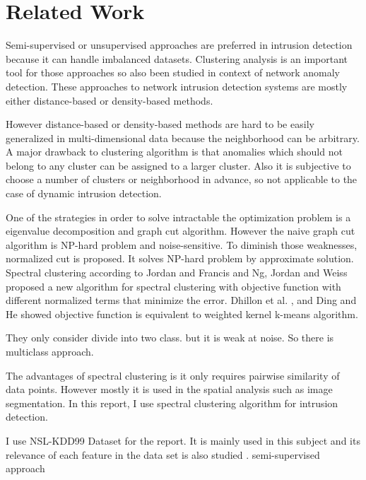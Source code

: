 \section{Related Work}
Semi-supervised or unsupervised approaches are preferred in intrusion detection\cite{chandola09} because it can handle imbalanced datasets.
Clustering analysis is an important tool for those approaches so also been studied in context of network anomaly detection. 
These approaches to network intrusion detection systems are mostly either distance-based\cite{knorr00}\cite{ramaswamy00} or density-based methods\cite{breuning00}\cite{aggarwal01}. 

However distance-based or density-based methods are hard to be easily generalized in multi-dimensional data because the neighborhood can be arbitrary. 
A major drawback to clustering algorithm is that anomalies which should not belong to any cluster can be assigned to a larger cluster. 
Also it is subjective to choose a number of clusters or neighborhood in advance, so not applicable to the case of dynamic intrusion detection. 

One of the strategies in order to solve intractable the optimization problem is a eigenvalue decomposition and graph cut algorithm. 
However the naive graph cut algorithm is NP-hard problem and noise-sensitive. 
To diminish those weaknesses, normalized cut\cite{jianbo00} is proposed. 
It solves NP-hard problem by approximate solution.
Spectral clustering according to Jordan and Francis \cite{jordan04} and Ng, Jordan and Weiss \cite{ng01} proposed a new algorithm for spectral clustering with objective function with different normalized terms that minimize the error.
Dhillon et al. \cite{dhillon04}, and Ding and He \cite{cding04} showed objective function is equivalent to weighted kernel k-means algorithm.

They only consider divide into two class. but it is weak at noise. So there is multiclass approach. \cite{jianbo03}

The advantages of spectral clustering is it only requires pairwise similarity of data points. 
However mostly it is used in the spatial analysis such as image segmentation. 
In this report, I use spectral clustering algorithm for intrusion detection. 

I use NSL-KDD99 Dataset for the report. 
It is mainly used in this subject\cite{tavallaee09} and its relevance of each feature in the data set is also studied\cite{olusola10} \cite{kayacik05}. 
semi-supervised approach
